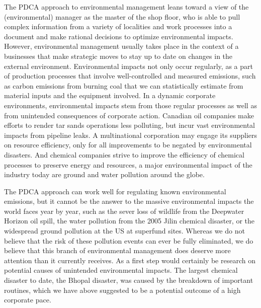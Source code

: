 The PDCA approach to environmental management leans toward a view of the (environmental) manager as the master of the shop floor, who is able to pull complex information from a variety of localities and work processes into a document and make rational decisions to optimize environmental impacts. However, environmental management usually takes place in the context of a businesses that make strategic moves to stay up to date on changes in the external environment. Environmental impacts not only occur regularly, as a part of production processes that involve well-controlled and measured emissions, such as carbon emissions from burning coal that we can statistically estimate from material inputs and the equipment involved. In a dynamic corporate environments, environmental impacts stem from those regular processes as well as from unintended consequences of corporate action. Canadian oil companies make efforts to render tar sands operations less polluting, but incur vast environmental impacts from pipeline leaks. A multinational corporation may engage its suppliers on resource efficiency, only for all improvements to be negated by environmental disasters. And chemical companies strive to improve the efficiency of chemical processes to preserve energy and resources, a major environmental impact of the industry today are ground and water pollution around the globe.

The PDCA approach can work well for regulating known environmental emissions, but it cannot be the answer to the massive environmental impacts the world faces year by year, such as the sever loss of wildlife from the Deepwater Horizon oil spill, the water pollution from the 2005 Jilin chemical disaster, or the widespread ground pollution at the US at superfund sites. Whereas we do not believe that the risk of these pollution events can ever be fully eliminated, we do believe that this branch of environmental management does deserve more attention than it currently receives. As a first step would certainly be research on potential causes of unintended environmental impacts. The largest chemical disaster to date, the Bhopal disaster, was caused by the breakdown of important routines\citep{Trotter1989}, which we have above suggested to be a potential outcome of a high corporate pace.






